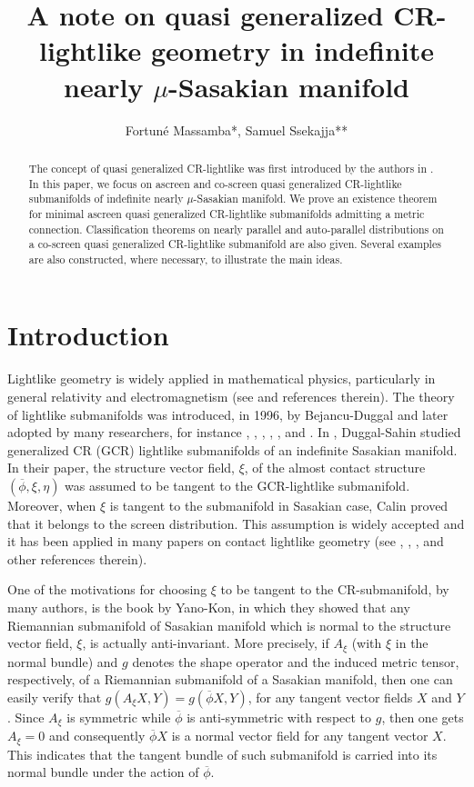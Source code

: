 \documentclass[reqno, 12pt]{amsart}
\title[A note on quasi generalized CR-lightlike geometry ]{A note on quasi generalized CR-lightlike geometry in indefinite nearly $\mu$-Sasakian manifold}
\author[Fortun\'{e} Massamba, Samuel Ssekajja ]{Fortun\'{e} Massamba*, Samuel Ssekajja**}
\numberwithin{equation}{section}
\begin{document}
 
\begin{abstract} 
The concept of quasi generalized CR-lightlike was first introduced by the authors in \cite{ms}. In this paper, we focus on ascreen and co-screen quasi generalized CR-lightlike submanifolds of indefinite nearly $\mu$-Sasakian manifold. We prove an existence theorem for minimal ascreen quasi generalized CR-lightlike submanifolds admitting a metric connection. Classification theorems on nearly parallel and auto-parallel distributions on a co-screen quasi generalized CR-lightlike submanifold are also given. Several examples are also constructed, where necessary, to illustrate the main ideas.
\end{abstract}

\maketitle

\section{Introduction}  

  Lightlike geometry is widely applied in mathematical physics, particularly in general relativity and electromagnetism (see \cite{db,ds2} and references therein). The theory of lightlike submanifolds was introduced, in 1996, by Bejancu-Duggal \cite{db} and later adopted by many researchers, for instance \cite{dj}, \cite{ds2}, \cite{ds3}, \cite{ds4}, \cite{ma1}, \cite{ma2} and \cite{ma22}. In \cite{ds3}, Duggal-Sahin studied generalized CR (GCR) lightlike submanifolds of an indefinite Sasakian manifold. In their paper, the structure vector field, $\xi$, of the almost contact structure $(\overline{\phi},\xi,\eta)$ was assumed to be tangent to the GCR-lightlike submanifold. Moreover, when $\xi$ is tangent to the submanifold in Sasakian case, Calin \cite{ca} proved that it belongs to the screen distribution. This assumption is widely accepted and it has been applied in many papers on contact lightlike geometry (see \cite{ds1}, \cite{ds2}, \cite{ds3}, \cite{ma1} and other references therein). 
  
  One of the motivations for choosing $\xi$ to be tangent to the CR-submanifold, by many authors, is the  book \cite[p. 48]{yano} by Yano-Kon, in which they showed that any Riemannian submanifold of Sasakian manifold which is normal to the structure vector field, $\xi$, is actually anti-invariant. More precisely, if $A_{\xi}$ (with $\xi$ in the normal bundle) and $g$ denotes the shape operator and the induced metric tensor, respectively, of a Riemannian submanifold of a Sasakian manifold, then one can easily verify that $g(A_{\xi}X,Y)=g(\overline{\phi}X,Y)$, for any tangent vector fields $X$ and $Y$. Since $A_{\xi}$ is symmetric while $\overline{\phi}$ is anti-symmetric with respect to $g$, then one gets $A_{\xi}=0$ and consequently $\overline{\phi}X$ is a normal vector field for any tangent vector $X$. This indicates that the tangent bundle of such submanifold is carried into its normal bundle under the action of $\overline{\phi}$. 
  
\end{document}
